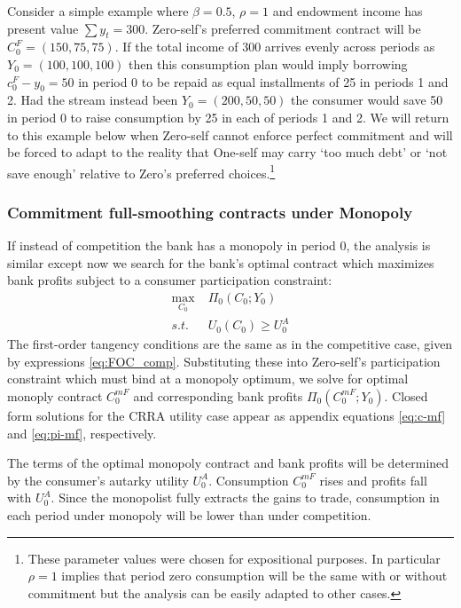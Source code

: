 \documentclass[11pt,english]{article}
\theoremstyle{plain}
\theoremstyle{definition}
\begin{document}
Consider a simple example where $\beta=0.5$, $\rho=1$ and endowment
income has present value $\sum y_{t}=300$. Zero-self's preferred commitment contract will be $C_{0}^{F}=(150,75,75)$.
If the total income of $300$ arrives evenly across
periods as $Y_{0}=(100,100,100)$ then this consumption plan would
imply borrowing $c_{0}^{F}-y_{0}=50$ in period 0 to be repaid as
equal installments of 25 in  periods 1 and 2. Had the stream instead
been $Y_{0}=(200,50,50)$ the consumer would save 50
in period 0 to raise consumption by 25 in each of periods 1 and 2.
We will return to this example  below when  Zero-self cannot enforce perfect commitment and will be forced to adapt to the reality that One-self may  carry `too much debt' or `not save enough' relative to Zero's preferred choices.\footnote{These parameter values were chosen for expositional purposes. In particular
$\rho=1$ implies that period zero consumption will be the same with
or without commitment but the analysis can be easily adapted to other
cases.}


\subsubsection{Commitment full-smoothing contracts under Monopoly}

\label{sec:own}

If instead of competition the bank has a monopoly in
period 0, the analysis is similar except now we search for the bank's optimal contract which maximizes bank profits subject
to a consumer participation constraint:
\begin{align}
\max_{C_{0}} & \;\Pi_{0}\left(C_{0};Y_{0}\right)\label{eq:monop-obj}\\
s.t. & \;U_{0}\left(C_{0}\right)\geq U_{0}^{A}\label{eq:CPC0}
\end{align}
The first-order tangency conditions are the same as in the competitive
case, given by expressions \ref{eq:FOC_comp}. Substituting these into Zero-self's participation constraint which must bind at a monopoly
optimum, we solve for optimal monoply contract $C_{0}^{mF}$
and corresponding bank profits $\Pi_{0}\left(C_{0}^{mF};Y_{0}\right)$.
Closed form solutions for the CRRA utility case appear as appendix
equations \ref{eq:c-mf} and \ref{eq:pi-mf}, respectively. 

The terms of the optimal monopoly contract and bank profits will be determined by the consumer's autarky
utility $U_{0}^{A}$. Consumption $C_{0}^{mF}$ rises and profits fall with $U_{0}^{A}$.
Since the monopolist fully extracts the gains to trade, consumption in
each period under monopoly will be lower than under competition. 
\end{document}
